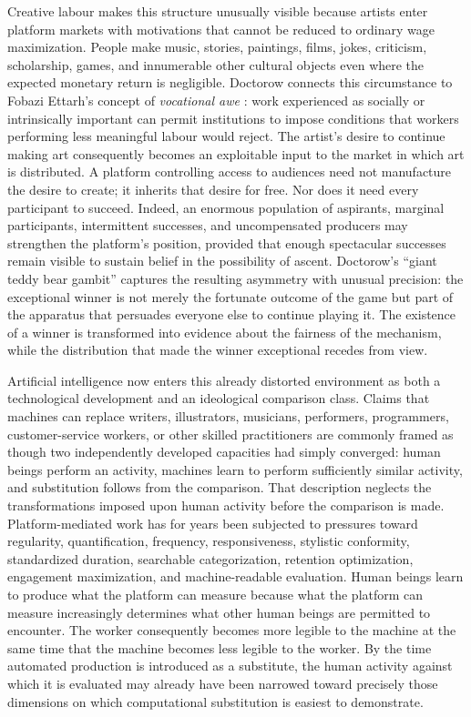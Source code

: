 \documentclass[11pt]{article}
\begin{document}
Creative labour makes this structure unusually visible because artists enter platform markets with motivations that cannot be reduced to ordinary wage maximization. People make music, stories, paintings, films, jokes, criticism, scholarship, games, and innumerable other cultural objects even where the expected monetary return is negligible. Doctorow connects this circumstance to Fobazi Ettarh's concept of \emph{vocational awe} \citep{ettarh2018vocationalawe}: work experienced as socially or intrinsically important can permit institutions to impose conditions that workers performing less meaningful labour would reject. The artist's desire to continue making art consequently becomes an exploitable input to the market in which art is distributed. A platform controlling access to audiences need not manufacture the desire to create; it inherits that desire for free. Nor does it need every participant to succeed. Indeed, an enormous population of aspirants, marginal participants, intermittent successes, and uncompensated producers may strengthen the platform's position, provided that enough spectacular successes remain visible to sustain belief in the possibility of ascent. Doctorow's ``giant teddy bear gambit'' \citep{doctorowgiblin2022chokepoint} captures the resulting asymmetry with unusual precision: the exceptional winner is not merely the fortunate outcome of the game but part of the apparatus that persuades everyone else to continue playing it. The existence of a winner is transformed into evidence about the fairness of the mechanism, while the distribution that made the winner exceptional recedes from view.

Artificial intelligence now enters this already distorted environment as both a technological development and an ideological comparison class. Claims that machines can replace writers, illustrators, musicians, performers, programmers, customer-service workers, or other skilled practitioners are commonly framed as though two independently developed capacities had simply converged: human beings perform an activity, machines learn to perform sufficiently similar activity, and substitution follows from the comparison. That description neglects the transformations imposed upon human activity before the comparison is made. Platform-mediated work has for years been subjected to pressures toward regularity, quantification, frequency, responsiveness, stylistic conformity, standardized duration, searchable categorization, retention optimization, engagement maximization, and machine-readable evaluation. Human beings learn to produce what the platform can measure because what the platform can measure increasingly determines what other human beings are permitted to encounter. The worker consequently becomes more legible to the machine at the same time that the machine becomes less legible to the worker. By the time automated production is introduced as a substitute, the human activity against which it is evaluated may already have been narrowed toward precisely those dimensions on which computational substitution is easiest to demonstrate.
\end{document}
